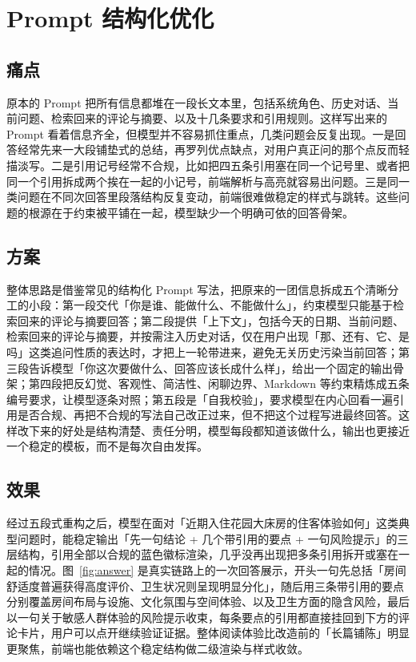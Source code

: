 \documentclass[11pt]{ctexart}
\begin{document}
\section{Prompt 结构化优化}

\subsection{痛点}

原本的 Prompt 把所有信息都堆在一段长文本里，包括系统角色、历史对话、当前问题、检索回来的评论与摘要、以及十几条要求和引用规则。这样写出来的 Prompt 看着信息齐全，但模型并不容易抓住重点，几类问题会反复出现。一是回答经常先来一大段铺垫式的总结，再罗列优点缺点，对用户真正问的那个点反而轻描淡写。二是引用记号经常不合规，比如把四五条引用塞在同一个记号里、或者把同一个引用拆成两个挨在一起的小记号，前端解析与高亮就容易出问题。三是同一类问题在不同次回答里段落结构反复变动，前端很难做稳定的样式与跳转。这些问题的根源在于约束被平铺在一起，模型缺少一个明确可依的回答骨架。

\subsection{方案}

整体思路是借鉴常见的结构化 Prompt 写法，把原来的一团信息拆成五个清晰分工的小段：第一段交代「你是谁、能做什么、不能做什么」，约束模型只能基于检索回来的评论与摘要回答；第二段提供「上下文」，包括今天的日期、当前问题、检索回来的评论与摘要，并按需注入历史对话，仅在用户出现「那、还有、它、是吗」这类追问性质的表达时，才把上一轮带进来，避免无关历史污染当前回答；第三段告诉模型「你这次要做什么、回答应该长成什么样」，给出一个固定的输出骨架；第四段把反幻觉、客观性、简洁性、闲聊边界、Markdown 等约束精炼成五条编号要求，让模型逐条对照；第五段是「自我校验」，要求模型在内心回看一遍引用是否合规、再把不合规的写法自己改正过来，但不把这个过程写进最终回答。这样改下来的好处是结构清楚、责任分明，模型每段都知道该做什么，输出也更接近一个稳定的模板，而不是每次自由发挥。

\subsection{效果}

经过五段式重构之后，模型在面对「近期入住花园大床房的住客体验如何」这类典型问题时，能稳定输出「先一句结论 + 几个带引用的要点 + 一句风险提示」的三层结构，引用全部以合规的蓝色徽标渲染，几乎没再出现把多条引用拆开或塞在一起的情况。图~\ref{fig:answer} 是真实链路上的一次回答展示，开头一句先总括「房间舒适度普遍获得高度评价、卫生状况则呈现明显分化」，随后用三条带引用的要点分别覆盖房间布局与设施、文化氛围与空间体验、以及卫生方面的隐含风险，最后以一句关于敏感人群体验的风险提示收束，每条要点的引用都直接挂回到下方的评论卡片，用户可以点开继续验证证据。整体阅读体验比改造前的「长篇铺陈」明显更聚焦，前端也能依赖这个稳定结构做二级渲染与样式收敛。
\end{document}
